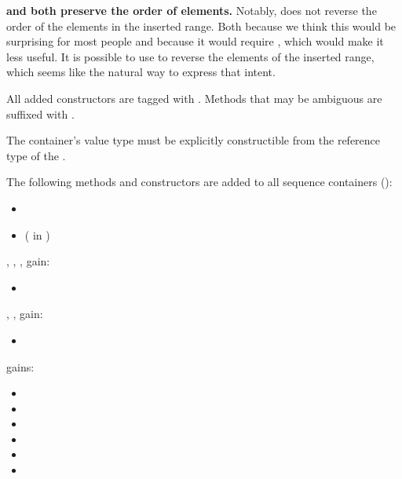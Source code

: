 \documentclass{wg21}
\begin{document}
\textbf{ and  both preserve the order of elements.}
Notably,  does not reverse the order of the elements in the inserted range.
Both because we think this would be surprising for most people and because it would require ,
which would make it less useful. It is possible to use  to reverse the elements of the inserted range,
which seems like the natural way to express that intent.


All added constructors are tagged with . Methods that may be ambiguous are suffixed with .

The container's value type must be explicitly constructible from the reference type of the  .

The following methods and constructors are added to all sequence containers ():

\begin{itemize}
    \item {}
    \item {} ( in )
\end{itemize}

, , ,  gain:
\begin{itemize}
    \item {}
\end{itemize}

, ,  gain:
\begin{itemize}
    \item {}
\end{itemize}


 gains:

\begin{itemize}
\item {}
\item {}
\item {}
\item {}
\item {}
\item {}
\end{itemize}
\end{document}
